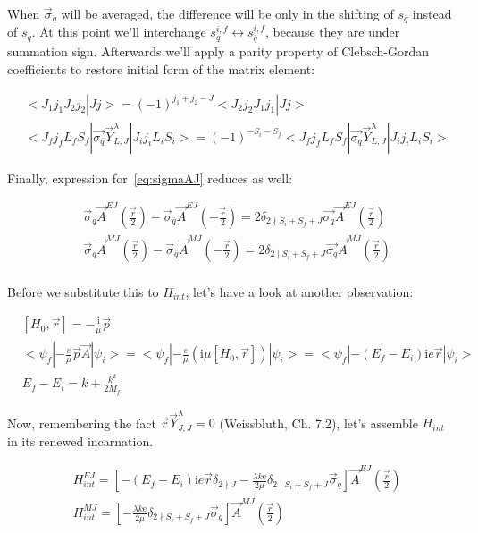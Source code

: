 When $\vec{\sigma}_{\overline{q}}$ will be averaged, the difference will be only in the shifting of $s_{\overline{q}}$ instead of $s_q$. At this point we'll interchange $s^{i,f}_{q} \leftrightarrow s^{i,f}_{\overline{q}}$, because they are under summation sign. Afterwards we'll apply a parity property of Clebsch-Gordan coefficients to restore initial form of the matrix element:

\begin{align}
    &<J_1 j_1 J_2 j_2 | J j> = (-1)^{j_1 + j_2 - J} <J_2 j_2 J_1 j_1 | J j> \\
    &<J_f j_f L_f S_f| \vec{\sigma_{\overline{q}}} \vec{Y}_{L, J}^\lambda |J_i j_i L_i S_i> = (-1)^{-S_i - S_f} <J_f j_f L_f S_f| \vec{\sigma_{q}} \vec{Y}_{L, J}^\lambda |J_i j_i L_i S_i>
\end{align}

Finally, expression for~\cref{eq:sigmaAJ} reduces as well:

\begin{align}
    &\vec{\sigma}_{q} \vec{A}^{EJ}(\frac{\vec{r}}{2}) - \vec{\sigma}_{\overline{q}} \vec{A}^{EJ}(-\frac{\vec{r}}{2}) = 2 \delta_{2 \nmid S_i + S_f + J} \vec{\sigma_{q}} \vec{A}^{EJ}(\frac{\vec{r}}{2}) \\
    &\vec{\sigma}_{q} \vec{A}^{MJ}(\frac{\vec{r}}{2}) - \vec{\sigma}_{\overline{q}} \vec{A}^{MJ}(-\frac{\vec{r}}{2}) = 2 \delta_{2 \mid S_i + S_f + J} \vec{\sigma_{q}} \vec{A}^{MJ}(\frac{\vec{r}}{2}) \\
\end{align}

Before we substitute this to $H_{int}$, let's have a look at another observation:

\begin{align}
    &[H_0, \vec{r}] = -\frac{\mathrm{i}}{\mu} \vec{p} \\
    &<\psi_f| -\frac{e}{\mu} \vec{p} \vec{A} |\psi_i> = <\psi_f| -\frac{e}{\mu} \left( \mathrm{i} \mu [H_0, \vec{r}]  \right) |\psi_i> = <\psi_f| -(E_f - E_i) \mathrm{i} e \vec{r} |\psi_i> \\
    &E_f - E_i = k + \frac{k^2}{2 M_f}
\end{align}

Now, remembering the fact $\vec{r} \vec{Y}^\lambda_{J, J} = 0$ (Weissbluth, Ch. 7.2)\cite{weissbluth}, let's assemble $H_{int}$ in its renewed incarnation.

\begin{align}
    &H_{int}^{EJ} = \left[-(E_f - E_i) \mathrm{i} e \vec{r} \delta_{2 \nmid J} - \frac{\lambda k \mathrm{e}}{2 \mu} \delta_{2 \mid S_i + S_f + J} \vec{\sigma}_{q} \right] \vec{A}^{EJ}(\frac{\vec{r}}{2}) \\
    &H_{int}^{MJ} = \left[ -\frac{\lambda k \mathrm{e}}{2 \mu} \delta_{2 \nmid S_i + S_f + J} \vec{\sigma}_{q} \right] \vec{A}^{MJ}(\frac{\vec{r}}{2})
\end{align}

